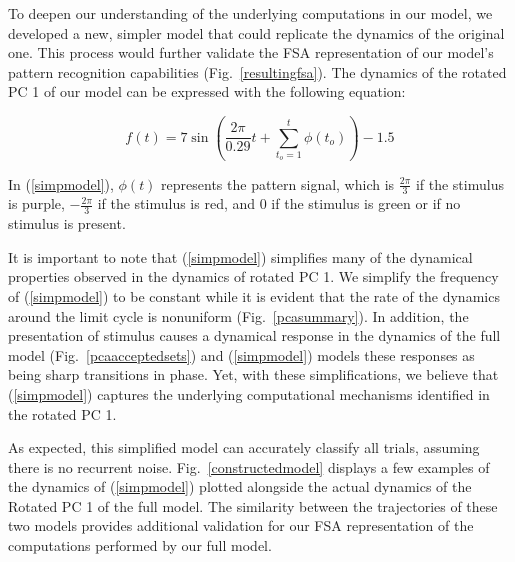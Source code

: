 \documentclass[conference]{IEEEtran}
\begin{document}
To deepen our understanding of the underlying computations in our model, we developed a new, simpler model that could replicate the dynamics of the original one. This process would further validate the FSA representation of our model's pattern recognition capabilities (Fig.~\ref{resultingfsa}). The dynamics of the rotated PC 1 of our model can be expressed with the following equation:

\begin{equation}
f(t) = 7\sin (\frac{2\pi}{0.29}t+\sum^t_{t_o=1}\phi(t_o))-1.5\label{simpmodel}
\end{equation}

In (\ref{simpmodel}), $\phi(t)$ represents the pattern signal, which is $\frac{2\pi}{3}$ if the stimulus is purple, $-\frac{2\pi}{3}$ if the stimulus is red, and $0$ if the stimulus is green or if no stimulus is present.

It is important to note that (\ref{simpmodel}) simplifies many of the dynamical properties observed in the dynamics of rotated PC 1. We simplify the frequency of (\ref{simpmodel}) to be constant while it is evident that the rate of the dynamics around the limit cycle is nonuniform (Fig.~\ref{pcasummary}). In addition, the presentation of stimulus causes a dynamical response in the dynamics of the full model (Fig.~\ref{pcaacceptedsets}) and (\ref{simpmodel}) models these responses as being sharp transitions in phase. Yet, with these simplifications, we believe that (\ref{simpmodel}) captures the underlying computational mechanisms identified in the rotated PC 1.

As expected, this simplified model can accurately classify all trials, assuming there is no recurrent noise. Fig.~\ref{constructedmodel} displays a few examples of the dynamics of (\ref{simpmodel}) plotted alongside the actual dynamics of the Rotated PC 1 of the full model. The similarity between the trajectories of these two models provides additional validation for our FSA representation of the computations performed by our full model.
\end{document}
